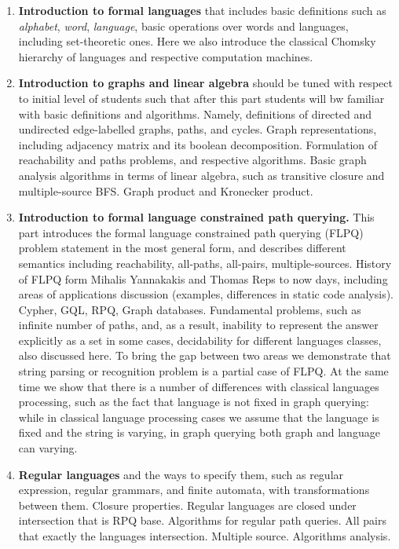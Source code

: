 \documentclass[sigconf]{acmart}
\begin{document}
\begin{enumerate}
  \item \label{fl_intro} \textbf{Introduction to formal languages} that includes basic definitions such as \emph{alphabet}, \emph{word}, \emph{language}, basic operations over words and languages, including set-theoretic ones. 
  Here we also introduce the classical Chomsky hierarchy of languages and respective computation machines.
  
  \item \label{graphs_intro} \textbf{Introduction to graphs and linear algebra} should be tuned with respect to initial level of students such that after this part students will bw familiar with basic definitions and algorithms. 
  Namely, definitions of directed and undirected edge-labelled graphs, paths, and cycles. 
  Graph representations, including adjacency matrix and its boolean decomposition.
  Formulation of reachability and paths problems, and respective algorithms.  
  Basic graph analysis algorithms in terms of linear algebra, such as transitive closure and multiple-source BFS.
  Graph product and Kronecker product.
  
  \item \label{flpq_intro} \textbf{Introduction to formal language constrained path querying.} 
  This part introduces the formal language constrained path querying (FLPQ)~\cite{doi:10.1137/S0097539798337716} problem statement in the most general form, and describes different semantics including reachability, all-paths, all-pairs, multiple-sources. 
  History of FLPQ form Mihalis Yannakakis and Thomas Reps to now days, including areas of applications discussion (examples, differences in static code analysis). 
  Cypher, GQL, RPQ, Graph databases. 
  Fundamental problems, such as infinite number of paths, and, as a result, inability to represent the answer explicitly as a set in some cases, decidability for different languages classes, also discussed here. 
  To bring the gap between two areas we demonstrate that string parsing or recognition problem is a partial case of FLPQ. 
  At the same time we show that there is a number of differences with classical languages processing, such as the fact that language is not fixed in graph querying: while in classical language processing cases we assume that the language is fixed and the string is varying, in graph querying both graph and language can varying.

  \item \label{regular_languages_intro} \textbf{Regular languages} and the ways to specify them, such as regular expression, regular grammars, and finite automata, with transformations between them.
  Closure properties. Regular languages are closed under intersection that is RPQ base.
  Algorithms for regular path queries.
  All pairs that exactly the languages intersection. 
  Multiple source. 
  Algorithms analysis.
  

\end{enumerate}
\end{document}
